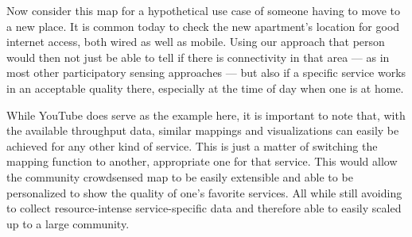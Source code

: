 Now consider this map for a hypothetical use case of someone having to move to a new place. It is common today to check the new apartment's location for good internet access, both wired as well as mobile. Using our approach that person would then not just be able to tell if there is connectivity in that area --- as in most other participatory sensing approaches --- but also if a specific service works in an acceptable quality there, especially at the time of day when one is at home.

While YouTube does serve as the example here, it is important to note that, with the available throughput data, similar mappings and visualizations can easily be achieved for any other kind of service. This is just a matter of switching the mapping function to another, appropriate one for that service. This would allow the community crowdsensed map to be easily extensible and able to be personalized to show the quality of one's favorite services. All while still avoiding to collect resource-intense service-specific data and therefore able to easily scaled up to a large community.
